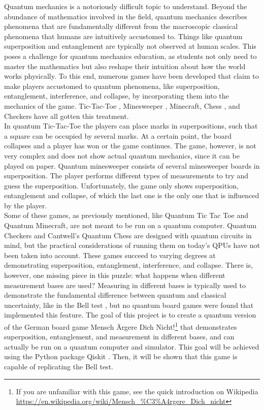 \documentclass[final,5p,times,twocolumn,authoryear]{elsarticle}
\begin{document}
Quantum mechanics is a notoriously difficult topic to understand. Beyond the abundance of mathematics involved in the field, quantum mechanics describes phenomena that are fundamentally different from the macroscopic classical phenomena that humans are intuitively accustomed to. Things like quantum superposition and entanglement are typically not observed at human scales. This poses a challenge for quantum mechanics education, as students not only need to master the mathematics but also reshape their intuition about how the world works physically. To this end, numerous games have been developed that claim to make players accustomed to quantum phenomena, like superposition, entanglement, interference, and collapse, by incorporating them into the mechanics of the game. Tic-Tac-Toe \cite{10.1119/1.2213635}, Minesweeper \cite{Quantum_Minesweeper}, Minecraft, Chess \cite{Akl2010OnTI, cantwell2019quantumchessdevelopingmathematical}, and Checkers have all gotten this treatment. \\
In quantum Tic-Tac-Toe the players can place marks in superpositions, such that a square can be occupied by several marks. At a certain point, the board collapses and a player has won or the game continues.  The game, however, is not very complex and does not show actual quantum mechanics, since it can be played on paper. Quantum minesweeper consists of several minesweeper boards in superposition. The player performs different types of measurements to try and guess the superposition. Unfortunately, the game only shows superposition, entanglement and collapse, of which the last one is the only one that is influenced by the player. \\  
Some of these games, as previously mentioned, like Quantum Tic Tac Toe and Quantum Minecraft, are not meant to be run on a quantum computer. Quantum Checkers and Cantwell's Quantum Chess are designed with quantum circuits in mind, but the practical considerations of running them on today's QPUs have not been taken into account. These games succeed to varying degrees at demonstrating superposition, entanglement, interference, and collapse. There is, however, one missing piece in this puzzle: what happens when different measurement bases are used? Measuring in different bases is typically used to demonstrate the fundamental difference between quantum and classical uncertainty, like in the Bell test \cite{BellSecond, BellOriginal}, but no quantum board games were found that implemented this feature. The goal of this project is to create a quantum version of the German board game Mensch Ärgere Dich Nicht!\footnote{If you are unfamiliar with this game, see the quick introduction on Wikipedia \url{https://en.wikipedia.org/wiki/Mensch_\%C3\%A4rgere_Dich_nicht}} that demonstrates superposition, entanglement, and measurement in different bases, and can actually be run on a quantum computer and simulator. This goal will be achieved using the Python package Qiskit \cite{qiskit2024}. Then, it will be shown that this game is capable of replicating the Bell test.
\end{document}
